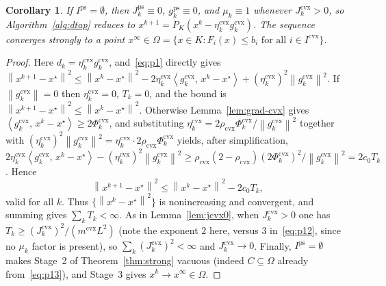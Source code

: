 \documentclass[]{interact}
\theoremstyle{plain}
\newtheorem{corollary}[theorem]{Corollary}
\theoremstyle{definition}
\theoremstyle{remark}
\newcommand{\norm}[1]{\left\lVert #1 \right\rVert}
\newcommand{\inner}[2]{\left\langle #1,\, #2 \right\rangle}
\newcommand{\cvx}{\mathrm{cvx}}
\newcommand{\ps}{\mathrm{ps}}
\begin{document}
\begin{corollary}\label{cor:cvx}
If $I^{\ps}=\emptyset$, then $J^{\ps}_k\equiv0$, $g^{\ps}_k\equiv0$, and $\mu_k\equiv1$
whenever $J^{\cvx}_k>0$, so Algorithm~\ref{alg:dtap} reduces to
$x^{k+1}=P_K(x^k-\eta^{\cvx}_k g^{\cvx}_k)$. The sequence converges strongly to a point
$x^\infty\in\Omega=\{x\in K:F_i(x)\le b_i\text{ for all }i\in I^{\cvx}\}$.
\end{corollary}
\begin{proof}
Here $d_k=\eta^{\cvx}_k g^{\cvx}_k$, and~\eqref{eq:p1} directly gives
$\norm{x^{k+1}-x^\star}^2\le\norm{x^k-x^\star}^2-2\eta^{\cvx}_k\inner{g^{\cvx}_k}{x^k-x^\star}+(\eta^{\cvx}_k)^2\norm{g^{\cvx}_k}^2$.
If $\norm{g^{\cvx}_k}=0$ then $\eta^{\cvx}_k=0$, $T_k=0$, and the bound is
$\norm{x^{k+1}-x^\star}^2\le\norm{x^k-x^\star}^2$. Otherwise Lemma~\ref{lem:grad-cvx} gives
$\inner{g^{\cvx}_k}{x^k-x^\star}\ge2\Phi^{\cvx}_k$, and substituting
$\eta^{\cvx}_k=2\rho_{\cvx}\Phi^{\cvx}_k/\norm{g^{\cvx}_k}^2$ together with
$(\eta^{\cvx}_k)^2\norm{g^{\cvx}_k}^2=\eta^{\cvx}_k\cdot2\rho_{\cvx}\Phi^{\cvx}_k$ yields, after
simplification,
$2\eta^{\cvx}_k\inner{g^{\cvx}_k}{x^k-x^\star}-(\eta^{\cvx}_k)^2\norm{g^{\cvx}_k}^2\ge\rho_{\cvx}(2-\rho_{\cvx})(2\Phi^{\cvx}_k)^2/\norm{g^{\cvx}_k}^2=2c_0T_k$.
Hence
\begin{equation}\label{eq:p15}
\norm{x^{k+1}-x^\star}^2\le\norm{x^k-x^\star}^2-2c_0T_k ,
\end{equation}
valid for all $k$. Thus $\{\norm{x^k-x^\star}^2\}$ is nonincreasing and convergent, and
summing gives $\sum_k T_k<\infty$. As in Lemma~\ref{lem:jcvx0}, when $J^{\cvx}_k>0$ one has
$T_k\ge(J^{\cvx}_k)^2/(m^{\cvx}L^2)$ (note the exponent $2$ here, versus $3$
in~\eqref{eq:p12}, since no $\mu_k$ factor is present), so $\sum_k(J^{\cvx}_k)^2<\infty$ and
$J^{\cvx}_k\to0$. Finally, $I^{\ps}=\emptyset$ makes Stage~2 of
Theorem~\ref{thm:strong} vacuous (indeed $C\subseteq\Omega$ already
from~\eqref{eq:p13}), and Stage~3 gives $x^k\to x^\infty\in\Omega$.
\end{proof}
\end{document}
